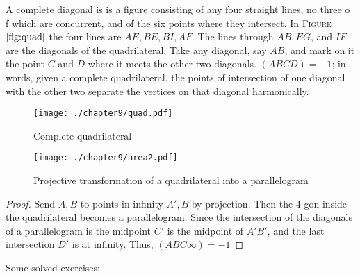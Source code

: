 \begin{theorem}
A complete diagonal is is a figure consisting of any four straight lines, no three o f which are concurrent, and of the six points where they intersect. In \textsc{Figure $\ref{fig:quad}$} the four lines are $AE,BE, BI, AF$. The lines through $AB, EG$, and $IF$ are the diagonals of the quadrilateral. Take any diagonal, say $AB$, and mark on it the point $C$ and $D$ where it meets the other two diagonals. $(ABCD)= -1$; in words, given a complete quadrilateral, the points of intersection of one diagonal with the other two separate the vertices on that diagonal harmonically.
\begin{figure}[hbp] %
\centering
\texttt{[image: ./chapter9/quad.pdf]} 
\caption{Complete quadrilateral} 
\label{fig:quad}
\end{figure}

\begin{figure}[htbp] %
\centering
\texttt{[image: ./chapter9/area2.pdf]} 
\caption{Projective transformation of a quadrilateral into a parallelogram} 
\label{fig:area2}
\end{figure}
\begin{proof}
Send $A,B$ to points in infinity $A',B' $by projection. Then the 4-gon inside the quadrilateral becomes a parallelogram. Since the intersection of the diagonals of a parallelogram is the midpoint $C'$ is the midpoint of $A'B'$, and the last intersection $D'$ is at infinity. Thus, $(ABC\infty)= -1$
\end{proof}
\end{theorem}

Some solved exercises:

